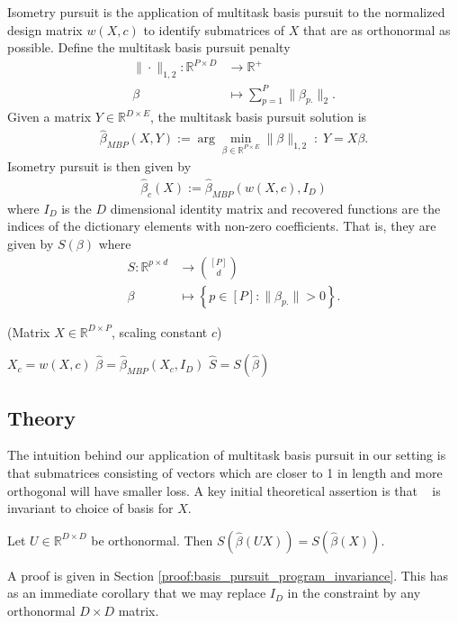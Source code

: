 Isometry pursuit is the application of multitask basis pursuit to the normalized design matrix $w(X, c)$ to identify submatrices of $ X$ that are as orthonormal as possible.
Define the multitask basis pursuit penalty 
\begin{align}
\label{eq:bp}
\| \cdot \|_{1,2}: \mathbb R^{P \times D} &\to \mathbb R^+ \\ 
\beta &\mapsto  \sum_{p=1}^P  \|\beta_{p.}\|_2.
\end{align}
Given a matrix $Y \in \mathbb R^{D \times E}$, the multitask basis pursuit solution is
\begin{align}
\label{prog:multitask_basis_pursuit}
\widehat \beta_{MBP} (X, Y)  := \arg \min_{\beta \in \mathbb R^{P \times E}} \| \beta \|_{1,2} \; : \;Y =  X \beta.
\end{align}
Isometry pursuit is then given by
\begin{align}
\label{prog:isometry_pursuit}
\widehat \beta_c ( X) := \widehat \beta_{MBP} ( w(X,c), I_D )
\end{align}
where $I_D$ is the $D$ dimensional identity matrix and recovered functions are the indices of the dictionary elements with non-zero coefficients.
That is, they are given by $S(\beta)$ where
\begin{align}
S: \mathbb{R}^{p \times d} &\to \binom{[P]}{d} \\
\beta &\mapsto \left\{ p \in [P] :  \|\beta_{p.}\| > 0 \right\}.
\end{align}
\begin{algorithm}[H]
\caption{\isometrypursuit(Matrix ${X} \in \mathbb{R}^{D \times P}$, scaling constant $c$)}
\begin{algorithmic}[1]
 $X_c = w({X},c)$
 $\widehat \beta = \widehat \beta_{MBP} (X_c, I_D)$
 $\widehat{S} = S (\widehat \beta)$
\end{algorithmic}
\end{algorithm}

\subsection{Theory}

The intuition behind our application of multitask basis pursuit in our setting is that submatrices consisting of vectors which are closer to 1 in length and more orthogonal will have smaller loss.
A key initial theoretical assertion is that  \isometrypursuit~ is invariant to choice of basis for $ X$.
\begin{proposition}
\label{prop:basis_pursuit_selection_invariance}
Let $U \in \mathbb R^{D \times D}$ be orthonormal.
Then $S(\widehat \beta  (U  X)) = S(\widehat \beta ( X))$.
\end{proposition}
A proof is given in Section \ref{proof:basis_pursuit_program_invariance}.
This has as an immediate corollary that we may replace $I_D$ in the constraint by any orthonormal $D \times D$ matrix.

